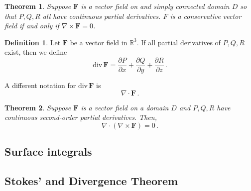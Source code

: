 \documentclass[
]{article}
\newtheorem{theorem}{Theorem}[section]
\theoremstyle{definition}
\newtheorem{definition}{Definition}[section]
\theoremstyle{definition}
\theoremstyle{definition}
\theoremstyle{definition}
\theoremstyle{remark}
\begin{document}
\begin{theorem}
Suppose \(\mathbf{F}\) is a vector field on and simply connected domain \(D\) so that \(P,Q,R\)
all have continuous partial derivatives.
\(F\) is a conservative vector field if and only if
\(\nabla \times \mathbf{F} = 0\).
\end{theorem}

\begin{definition}
Let \(\mathbf{F}\) be a vector field in \(\mathbb{R}^3\).
If all partial derivatives of \(P,Q,R\) exist, then we define
\begin{equation*}
    \mathrm{div}\,\mathbf{F} =  
    \frac{\partial P}{\partial x} + \frac{\partial Q}{\partial y} + \frac{\partial R}{\partial z} \,.
\end{equation*}
\end{definition}

A different notation for \(\mathrm{div} \, \mathbf{F}\) is
\begin{equation*}
    \nabla \cdot \mathbf{F} \,.
\end{equation*}

\begin{theorem}
Suppose \(\mathbf{F}\) is a vector field on a domain \(D\) and \(P,Q,R\) have continuous
second-order partial derivatives.
Then,
\begin{equation*}
    \nabla \cdot (\nabla \times \mathbf{F}) = 0 \,.
\end{equation*}
\end{theorem}

\hypertarget{surface-integrals}{%
\subsection{Surface integrals}\label{surface-integrals}}

\hypertarget{stokes-and-divergence-theorem}{%
\subsection{Stokes' and Divergence Theorem}\label{stokes-and-divergence-theorem}}
\end{document}
